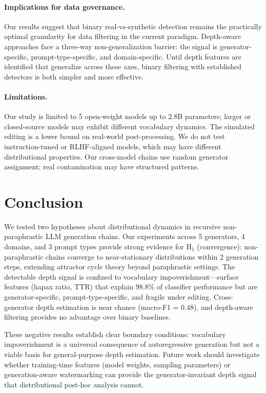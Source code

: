 \documentclass[letterpaper]{article}
\begin{document}
\paragraph{Implications for data governance.}
Our results suggest that binary real-vs-synthetic detection remains the practically optimal granularity for data filtering in the current paradigm. Depth-aware approaches face a three-way non-generalization barrier: the signal is generator-specific, prompt-type-specific, and domain-specific. Until depth features are identified that generalize across these axes, binary filtering with established detectors \citep{bao2024fastdetectgpt,tulchinskii2024ldscore} is both simpler and more effective.

\paragraph{Limitations.}
Our study is limited to 5 open-weight models up to 2.8B parameters; larger or closed-source models may exhibit different vocabulary dynamics. The simulated editing is a lower bound on real-world post-processing. We do not test instruction-tuned or RLHF-aligned models, which may have different distributional properties. Our cross-model chains use random generator assignment; real contamination may have structured patterns.

\section{Conclusion}
\label{sec:conclusion}

We tested two hypotheses about distributional dynamics in recursive non-paraphrastic LLM generation chains. Our experiments across 5 generators, 4 domains, and 3 prompt types provide strong evidence for H$_1$ (convergence): non-paraphrastic chains converge to near-stationary distributions within 2 generation steps, extending attractor cycle theory beyond paraphrastic settings. The detectable depth signal is confined to vocabulary impoverishment---surface features (hapax ratio, TTR) that explain 98.8\% of classifier performance but are generator-specific, prompt-type-specific, and fragile under editing. Cross-generator depth estimation is near chance (macro-F1 = 0.48), and depth-aware filtering provides no advantage over binary baselines.

These negative results establish clear boundary conditions: vocabulary impoverishment is a universal consequence of autoregressive generation but not a viable basis for general-purpose depth estimation. Future work should investigate whether training-time features (model weights, sampling parameters) or generation-aware watermarking can provide the generator-invariant depth signal that distributional post-hoc analysis cannot.
\end{document}
